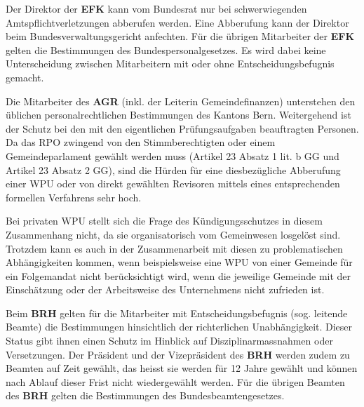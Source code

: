 \documentclass[10pt]{article}
\begin{document}
Der Direktor der \textbf{EFK} kann vom Bundesrat nur bei schwerwiegenden Amtspflicht­verletzungen abberufen werden. Eine Abberufung kann der Direktor beim Bundesver­waltungsgericht anfechten. Für die übrigen Mitarbeiter der \textbf{EFK} gelten die Bestimmungen des Bundespersonalgesetzes. Es wird dabei keine Unterscheidung zwischen Mitarbeitern mit oder ohne Entscheidungsbefugnis gemacht.

Die Mitarbeiter des \textbf{AGR} (inkl. der Leiterin Gemeindefinanzen) unterstehen den üblichen personalrechtlichen Bestimmungen des Kantons Bern. Weitergehend ist der Schutz bei den mit den eigentlichen Prüfungsaufgaben beauftragten Personen. Da das RPO zwingend von den Stimmberechtigten oder einem Gemeindeparlament gewählt werden muss (Artikel 23 Absatz 1 lit. b GG und Artikel 23 Absatz 2 GG), sind die Hürden für eine diesbezügliche Abberufung einer WPU oder von direkt gewählten Revisoren mittels eines entsprechenden formellen Verfahrens sehr hoch.

Bei privaten WPU stellt sich die Frage des Kündigungsschutzes in diesem Zusammenhang nicht, da sie organisatorisch vom Gemeinwesen losgelöst sind. Trotzdem kann es auch in der Zusammenarbeit mit diesen zu problematischen Abhängigkeiten kommen, wenn beispielsweise eine WPU von einer Gemeinde für ein Folgemandat nicht berücksichtigt wird, wenn die jeweilige Gemeinde mit der Einschätzung oder der Arbeitsweise des Unternehmens nicht zufrieden ist.

Beim \textbf{BRH} gelten für die Mitarbeiter mit Entscheidungsbefugnis (sog. leitende Beamte) die Bestimmungen hinsichtlich der richterlichen Unabhängigkeit. Dieser Status gibt ihnen einen Schutz im Hinblick auf Disziplinarmassnahmen oder Versetzungen. Der Präsident und der Vizepräsident des \textbf{BRH} werden zudem zu Beamten auf Zeit gewählt, das heisst sie werden für 12 Jahre gewählt und können nach Ablauf dieser Frist nicht wiedergewählt werden. Für die übrigen Beamten des \textbf{BRH} gelten die Bestimmungen des Bundesbeamtengesetzes.
\end{document}
